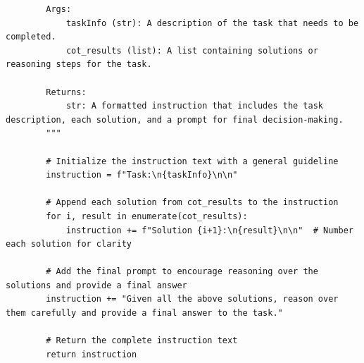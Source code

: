 \documentclass{article}
\theoremstyle{plain}
\theoremstyle{definition}
\theoremstyle{remark}
\begin{document}
\begin{lstlisting}
        Args:
            taskInfo (str): A description of the task that needs to be completed.
            cot_results (list): A list containing solutions or reasoning steps for the task.

        Returns:
            str: A formatted instruction that includes the task description, each solution, and a prompt for final decision-making.
        """

        # Initialize the instruction text with a general guideline
        instruction = f"Task:\n{taskInfo}\n\n"

        # Append each solution from cot_results to the instruction
        for i, result in enumerate(cot_results):
            instruction += f"Solution {i+1}:\n{result}\n\n"  # Number each solution for clarity

        # Add the final prompt to encourage reasoning over the solutions and provide a final answer
        instruction += "Given all the above solutions, reason over them carefully and provide a final answer to the task."

        # Return the complete instruction text
        return instruction

\end{lstlisting}
\end{document}
